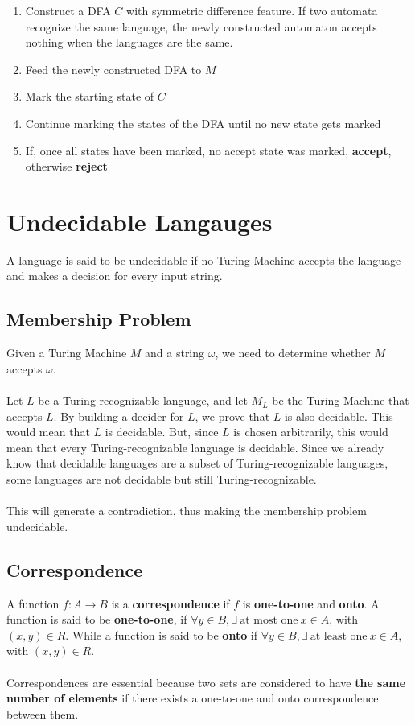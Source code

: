 \documentclass{article}
\begin{document}
\begin{enumerate}
	\item Construct a DFA $C$ with symmetric difference feature. If two automata recognize the same language, the newly constructed automaton accepts nothing when the languages are the same.
	\item Feed the newly constructed DFA to $M$
	\item Mark the starting state of $C$
	\item Continue marking the states of the DFA until no new state gets marked
	\item If, once all states have been marked, no accept state was marked, \textbf{accept}, otherwise \textbf{reject}
\end{enumerate}

\section{Undecidable Langauges}
A language is said to be undecidable if no Turing Machine accepts the language and makes a decision for every input string.

\subsection{Membership Problem}
Given a Turing Machine $M$ and a string $\omega$, we need to determine whether $M$ accepts $\omega$. \\ \\
Let $L$ be a Turing-recognizable language, and let $M_L$ be the Turing Machine that accepts $L$. By building a decider for $ L$, we prove that $L$ is also decidable. This would mean that $L$ is decidable. But, since $L$ is chosen arbitrarily, this would mean that every Turing-recognizable language is decidable. Since we already know that decidable languages are a subset of Turing-recognizable languages, some languages are not decidable but still Turing-recognizable. \\ \\
This will generate a contradiction, thus making the membership problem undecidable.

\subsection{Correspondence}
A function $f: A \rightarrow B$ is a \textbf{correspondence} if $f$ is \textbf{one-to-one} and \textbf{onto}. A function is said to be \textbf{one-to-one}, if $\forall y \in B, \exists~\text{at most one} ~ x \in A$, with $(x, y) \in R$. While a function is said to be \textbf{onto} if $\forall y \in B, \exists~\text{at least one} ~ x \in A$, with $(x, y) \in R$. \\ \\
Correspondences are essential because two sets are considered to have \textbf{the same number of elements} if there exists a one-to-one and onto correspondence between them.
\end{document}
